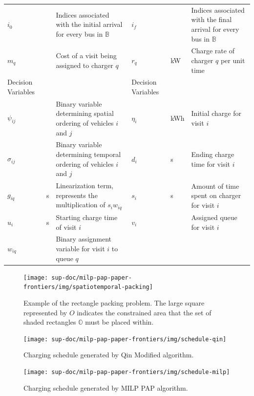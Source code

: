 \documentclass[ee,thesis]{usuthesis}
\begin{document}
\begin{landscape}
\begin{table}[htbp]
\begin{tabularx}{\paperwidth}{L{0.2} L{0.12} L{0.8} L{0.2} L{0.12} L{0.8}}
\(i_0\) &  & Indices associated with the initial arrival for every bus in \(\mathbb{B}\) & \(i_f\) &  & Indices associated with the final arrival for every bus in \(\mathbb{B}\)\\[0pt]
\(m_q\) &  & Cost of a visit being assigned to charger \(q\) & \(r_q\) & kW & Charge rate of charger \(q\) per unit time\\[0pt]
\hline
Decision Variables &  &  & Decision Variables &  & \\[0pt]
\(\psi_{ij}\) &  & Binary variable determining spatial ordering of vehicles \(i\) and \(j\) & \(\eta_i\) & kWh & Initial charge for visit \(i\)\\[0pt]
\(\sigma_{ij}\) &  & Binary variable determining temporal ordering of vehicles \(i\) and \(j\) & \(d_i\) & s & Ending charge time for visit \(i\)\\[0pt]
\(g_{iq}\) & s & Linearization term, represents the multiplication of \(s_i w_{iq}\) & \(s_i\) & s & Amount of time spent on charger for visit \(i\)\\[0pt]
\(u_i\) & s & Starting charge time of visit \(i\) & \(v_i\) &  & Assigned queue for visit \(i\)\\[0pt]
\(w_{iq}\) &  & Binary assignment variable for visit \(i\) to queue \(q\) &  &  & \\[0pt]
\hline
\end{tabularx}
\end{table}
\end{landscape}

\begin{figure}[htpb]
\centering
    \texttt{[image: sup-doc/milp-pap-paper-frontiers/img/spatiotemporal-packing]}
    \caption{Example of the rectangle packing problem. The large square represented by $O$ indicates the constrained
      area that the set of shaded rectangles $\mathbb{O}$ must be placed within.}
    \label{fig:packexample}
\end{figure}

\begin{subfigures}
    \begin{figure}[htpb]
    \centering
    \texttt{[image: sup-doc/milp-pap-paper-frontiers/img/schedule-qin]}
        \caption{Charging schedule generated by Qin Modified algorithm.}
        \label{subfig:qin-schedule}
    \end{figure}

    \hfill

    \begin{figure}[htpb]
    \centering
        \texttt{[image: sup-doc/milp-pap-paper-frontiers/img/schedule-milp]}
        \caption{Charging schedule generated by MILP PAP algorithm.}
        \label{subfig:milp-schedule}
    \end{figure}
\end{subfigures}
\end{document}

